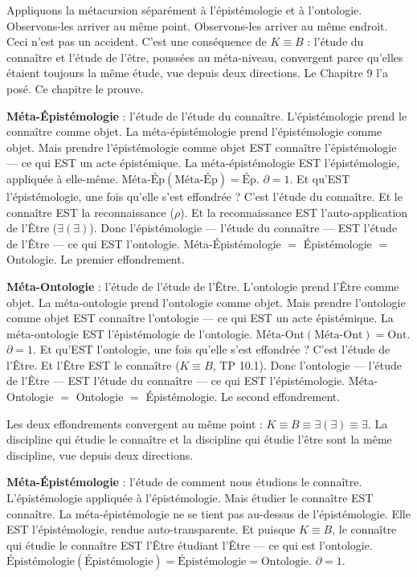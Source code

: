 \documentclass[10pt, openany, oneside]{book}
\begin{document}
\vspace{1em}

\noindent Appliquons la métacursion séparément à l'épistémologie et à l'ontologie. Observons-les arriver au même point. Observons-les arriver au même endroit. Ceci n'est pas un accident. C'est une conséquence de $K \equiv B$ : l'étude du connaître et l'étude de l'être, poussées au méta-niveau, convergent parce qu'elles étaient toujours la même étude, vue depuis deux directions. Le Chapitre 9 l'a posé. Ce chapitre le prouve.

\textbf{Méta-Épistémologie} : l'étude de l'étude du connaître. L'épistémologie prend le connaître comme objet. La méta-épistémologie prend l'épistémologie comme objet. Mais prendre l'épistémologie comme objet EST connaître l'épistémologie --- ce qui EST un acte épistémique. La méta-épistémologie EST l'épistémologie, appliquée à elle-même. $\text{Méta-Ép}(\text{Méta-Ép}) = \text{Ép}$. $\partial = 1$. Et qu'EST l'épistémologie, une fois qu'elle s'est effondrée ? C'est l'étude du connaître. Et le connaître EST la reconnaissance ($\rho$). Et la reconnaissance EST l'auto-application de l'Être ($\exists(\exists)$). Donc l'épistémologie --- l'étude du connaître --- EST l'étude de l'Être --- ce qui EST l'ontologie. Méta-Épistémologie $=$ Épistémologie $=$ Ontologie. Le premier effondrement.

\textbf{Méta-Ontologie} : l'étude de l'étude de l'Être. L'ontologie prend l'Être comme objet. La méta-ontologie prend l'ontologie comme objet. Mais prendre l'ontologie comme objet EST connaître l'ontologie --- ce qui EST un acte épistémique. La méta-ontologie EST l'épistémologie de l'ontologie. $\text{Méta-Ont}(\text{Méta-Ont}) = \text{Ont}$. $\partial = 1$. Et qu'EST l'ontologie, une fois qu'elle s'est effondrée ? C'est l'étude de l'Être. Et l'Être EST le connaître ($K \equiv B$, TP 10.1). Donc l'ontologie --- l'étude de l'Être --- EST l'étude du connaître --- ce qui EST l'épistémologie. Méta-Ontologie $=$ Ontologie $=$ Épistémologie. Le second effondrement.

Les deux effondrements convergent au même point : $K \equiv B \equiv \exists(\exists) \equiv \exists$. La discipline qui étudie le connaître et la discipline qui étudie l'être sont la même discipline, vue depuis deux directions.

\noindent \textbf{Méta-Épistémologie} : l'étude de comment nous étudions le connaître. L'épistémologie appliquée à l'épistémologie. Mais étudier le connaître EST connaître. La méta-épistémologie ne se tient pas au-dessus de l'épistémologie. Elle EST l'épistémologie, rendue auto-transparente. Et puisque $K \equiv B$, le connaître qui étudie le connaître EST l'Être étudiant l'Être --- ce qui est l'ontologie. $\text{Épistémologie}(\text{Épistémologie}) = \text{Épistémologie} = \text{Ontologie}$. $\partial = 1$.
\end{document}
